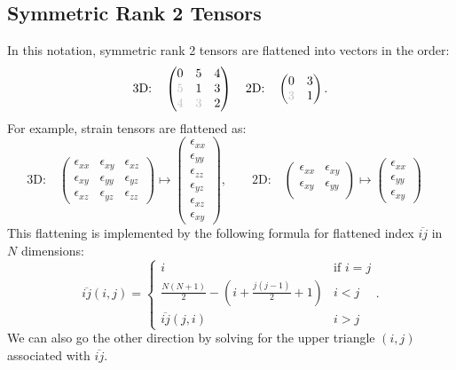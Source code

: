 \documentclass[10pt]{article}
\providecommand{\e}{\epsilon}
\begin{document}
\subsection{Symmetric Rank 2 Tensors}
In this notation, symmetric rank 2 tensors are flattened into vectors in the order:
$$
\text{3D:} \quad
\begin{pmatrix}
    0 & 5 & 4 \\
    \textcolor{lightgray}{5} & 1 & 3 \\
    \textcolor{lightgray}{4} & \textcolor{lightgray}{3} & 2
\end{pmatrix} \quad
\text{2D:} \quad
\begin{pmatrix}
    0 & 3 \\
    \textcolor{lightgray}{3} & 1
\end{pmatrix}.
$$
For example, strain tensors are flattened as:
$$
\text{3D:} \quad
\begin{pmatrix}
    \e_{xx} & \e_{xy} & \e_{xz} \\
    \e_{xy} & \e_{yy} & \e_{yz} \\
    \e_{xz} & \e_{yz} & \e_{zz}
\end{pmatrix} \mapsto
\begin{pmatrix}
    \e_{xx} \\
    \e_{yy} \\
    \e_{zz} \\
    \e_{yz} \\
    \e_{xz} \\
    \e_{xy}
\end{pmatrix}, \quad \quad
\text{2D:} \quad
\begin{pmatrix}
    \e_{xx} & \e_{xy}\\
    \e_{xy} & \e_{yy}\\
\end{pmatrix} \mapsto
\begin{pmatrix}
    \e_{xx} \\
    \e_{yy} \\
    \e_{xy}
\end{pmatrix} \quad
$$
This flattening is implemented by the following formula for flattened index
$\overline{ij}$ in $N$ dimensions:
$$
\overline{ij}(i, j) = \begin{cases}
    i & \text{if } i = j \\
    \frac{N (N + 1)}{2} - \left(i + \frac{j (j - 1)}{2} + 1\right) & i < j \\
    \overline{ij}(j, i)            & i > j
\end{cases} .
$$
We can also go the other direction by solving for the upper triangle $(i, j)$ associated with $\overline{ij}$.
\end{document}
